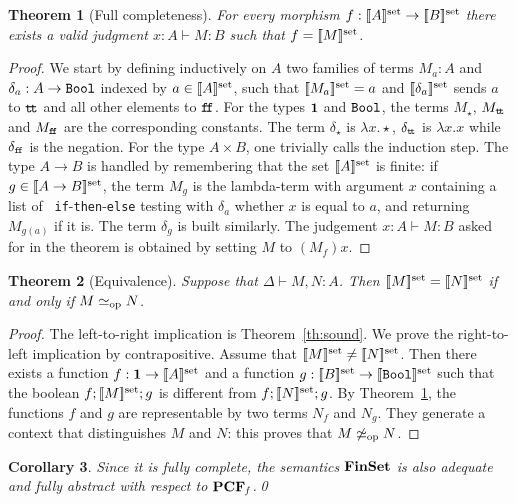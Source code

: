 \documentclass[10pt]{article}
\theoremstyle{plain}
\newtheorem{theorem}{Theorem}
\newtheorem{corollary}[theorem]{Corollary}
\theoremstyle{definition}
\newcommand{\FinSet}{\mbox{\bf FinSet}}
\newcommand{\tunit}{{\bf 1}}
\newcommand{\ttrue}{{\tt t}\!{\tt t}}
\newcommand{\ffalse}{{\tt f}\!{\tt f}}
\newcommand{\bit}{{\tt Bool}}
\newcommand{\opeq}{\mathrel{\simeq_{\rm op}}}
\newcommand{\fsdenot}[1]{{[\![{#1}]\!]^{\rm set}}}
\begin{document}
\begin{theorem}[Full completeness]
  \label{th:compl}
  For every morphism $f:\fsdenot{A}\to\fsdenot{B}$ there exists a valid
  judgment $x:A\vdash M:B$ such that $f = \fsdenot{M}$.
\end{theorem}

\begin{proof}
  We start by defining inductively on $A$ two families of terms
  $M_a:A$ and $\delta_a:A\to\bit$ indexed by $a\in\fsdenot{A}$, such
  that $\fsdenot{M_a}=a$ and $\fsdenot{\delta_a}$ sends $a$ to
  $\ttrue$ and all other elements to $\ffalse$. For the types $\tunit$
  and $\bit$, the terms $M_\star$, $M_{\ttrue}$ and $M_{\ffalse}$ are
  the corresponding constants. The term $\delta_\star$ is $\lambda
  x.\star$, $\delta_{\ttrue}$ is $\lambda x.x$ while $\delta_{\ffalse}$ is
  the negation. For the type $A\times B$, one trivially calls the
  induction step. The type $A\to B$ is handled by remembering that the
  set $\fsdenot{A}$ is finite: if $g\in\fsdenot{A\to B}$, the term
  $M_g$ is the lambda-term with argument $x$ containing a list of {\tt
    if}-{\tt then}-{\tt else} testing with $\delta_a$ whether $x$ is
  equal to $a$, and returning $M_{g(a)}$ if it is. The term $\delta_g$
  is built similarly.
The judgement $x:A\vdash M:B$ asked for in the theorem is obtained
  by setting $M$ to $(M_f)x$.
\end{proof}


\begin{theorem}[Equivalence]
  \label{th:eq}
  Suppose that $\Delta\vdash M,N : A$.  Then $\fsdenot{M} =
  \fsdenot{N}$ if and only if $M\opeq N$.
\end{theorem}

\begin{proof}
  The left-to-right implication is Theorem~\ref{th:sound}. We prove
  the right-to-left implication by contrapositive. Assume that
  $\fsdenot{M} \neq \fsdenot{N}$. Then there exists a function
  $f:\tunit\to\fsdenot{A}$ and a function
  $g:\fsdenot{B}\to\fsdenot{\bit}$ such that the boolean
  $f;\fsdenot{M};g$ is different from $f;\fsdenot{N};g$. By
  Theorem~\ref{th:compl}, the functions $f$ and $g$ are representable
  by two terms $N_f$ and $N_g$. They generate a context that
  distinguishes $M$ and $N$: this proves that $M \not\opeq N$.
\end{proof}

\begin{corollary}
  Since it is fully complete, the semantics $\FinSet$ is also adequate
  and fully abstract with respect to ${\bf PCF}_{\it f}$.\qed
\end{corollary}
\end{document}
